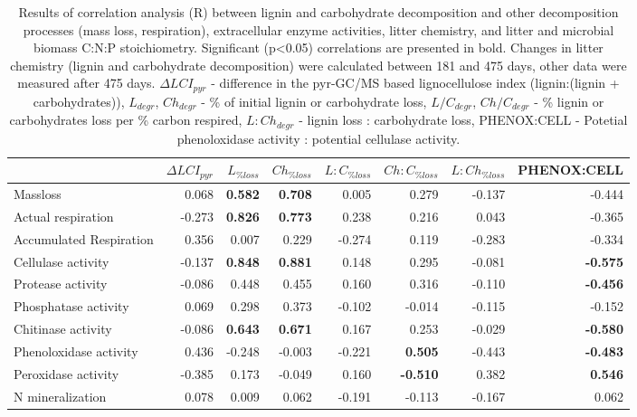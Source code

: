 \documentclass[10pt]{article}
\begin{document}
\begin{flushleft}
\begin{landscape}
\newpage
\begin{table}[h!]
\centering
\caption{Results of correlation analysis (R) between lignin and carbohydrate decomposition and other decomposition processes (mass loss, respiration), extracellular enzyme activities, litter chemistry, and litter and microbial biomass C:N:P stoichiometry. Significant (p\textless 0.05) correlations are presented in bold. Changes in litter chemistry (lignin and carbohydrate decomposition) were calculated between 181 and 475 days, other data were measured after 475 days. $\Delta LCI_{pyr}$ - difference in the pyr-GC/MS based lignocellulose index (lignin:(lignin + carbohydrates)), $L_{degr}$, $Ch_{degr}$ - \% of initial lignin or carbohydrate loss, $L/C_{degr}$, $Ch/C_{degr}$  - \% lignin or carbohydrates loss per \% carbon respired, $L:Ch_{degr}$ - lignin loss : carbohydrate loss, PHENOX:CELL - Potetial phenoloxidase activity : potential cellulase activity.} 
\label{corrtable2}
{\small
\begin{tabular}{lrrrrrrr}
  \hline
 & $\Delta LCI_{pyr}$ & $L_{\%loss}$ & $Ch_{\%loss}$ & $L:C_{\%loss}$ & $Ch:C_{\%loss}$ & $L:Ch_{\%loss}$ & PHENOX:CELL \\ 
  \hline
Massloss & 0.068 & \textbf{ 0.582 } & \textbf{ 0.708 } & 0.005 & 0.279 & -0.137 & -0.444 \\ 
  Actual respiration & -0.273 & \textbf{ 0.826 } & \textbf{ 0.773 } & 0.238 & 0.216 & 0.043 & -0.365 \\ 
  Accumulated Respiration & 0.356 & 0.007 & 0.229 & -0.274 & 0.119 & -0.283 & -0.334 \\ 
  Cellulase activity & -0.137 & \textbf{ 0.848 } & \textbf{ 0.881 } & 0.148 & 0.295 & -0.081 & \textbf{ -0.575 } \\ 
  Protease activity & -0.086 & 0.448 & 0.455 & 0.160 & 0.316 & -0.110 & \textbf{ -0.456 } \\ 
  Phosphatase activity & 0.069 & 0.298 & 0.373 & -0.102 & -0.014 & -0.115 & -0.152 \\ 
  Chitinase activity & -0.086 & \textbf{ 0.643 } & \textbf{ 0.671 } & 0.167 & 0.253 & -0.029 & \textbf{ -0.580 } \\ 
  Phenoloxidase activity & 0.436 & -0.248 & -0.003 & -0.221 & \textbf{ 0.505 } & -0.443 & \textbf{ -0.483 } \\ 
  Peroxidase activity & -0.385 & 0.173 & -0.049 & 0.160 & \textbf{ -0.510 } & 0.382 & \textbf{ 0.546 } \\ 
  N mineralization & 0.078 & 0.009 & 0.062 & -0.191 & -0.113 & -0.167 & 0.062 \\ 

\end{tabular}}
\end{table}
\end{landscape}
\end{flushleft}
\end{document}
